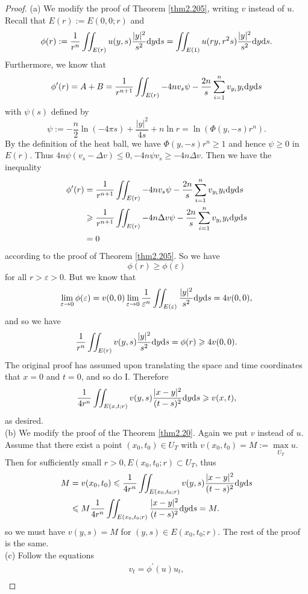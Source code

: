 \documentclass[hyperref,UTF8,12pt]{article}
\numberwithin{equation}{subsection}
\theoremstyle{plain}
\theoremstyle{definition}
\numberwithin{theorem}{section}
\numberwithin{lemma}{section}
\numberwithin{proposition}{section}
\numberwithin{remark}{section}
\numberwithin{corollary}{section}
\numberwithin{definition}{section}
\numberwithin{problem}{section}
\numberwithin{example}{section}
\def\dif{\textup{d}}
\renewcommand{\leq}{\leqslant}
\renewcommand{\geq}{\geqslant}
\newcommand{\ve}{\varepsilon}
\begin{document}
\begin{proof}
(a) We modify the proof of Theorem \ref{thm2.205}, writing $v$ instead of $u$. Recall that $E(r):=E(0,0;r)$ and \[\phi(r):=\frac{1}{r^n}\iint_{E(r)}u(y,s)\frac{|y|^2}{s^2}\dif y\dif s=\iint_{E(1)}u(ry,r^2s)\frac{|y|^2}{s^2}\dif y\dif s.\] Furthermore, we know that \[\phi^{\prime}(r)=A+B=\frac{1}{r^{n+1}}\iint_{E(r)}-4nv_s\psi-\frac{2n}{s} \sum_{i=1}^nv_{y_i}y_i\dif y\dif s\] with $\psi(s)$ defined by \[\psi:=-\frac{n}{2}
\ln(-4\pi s)+\frac{|y|^2}{4s}+n\ln r=\ln(\Phi(y,-s)r^n).\]By the definition of the heat ball, we have $\Phi(y,-s)r^n\geq1$ and hence $\psi\geq0$ in $E(r)$. Thus $4n\psi(v_s-\Delta v)\leq 0,-4n\psi v_s\geq-4n\Delta v$. Then we have the inequality
\[\begin{aligned}
	\phi^\prime(r)&=\frac{1}{r^{n+1}}\iint_{E(r)}-4nv_s\psi-\frac{2n}{s}\sum_{i=1}^n v_{y_i}y_i\dif y\dif s\\
	&\geq\frac{1}{r^{n+1}}\iint_{E(r)}-4n\Delta v\psi-\frac{2n}{s}\sum_{i=1}^n v_{y_i}y_i\dif y\dif s\\
	&=0\end{aligned}\]according to the proof of Theorem \ref{thm2.205}. So we have
\[\phi(r)\geq\phi(\ve)\]for all $r>\ve>0$. But we know that\[
\lim_{\ve\to0}\phi(\ve)=v(0,0)\lim_{\ve\to0}\frac{1}{\ve^n}\iint_{E(\ve)} \frac{|y|^2}{s^2}\dif y\dif s=4v(0,0),\]and so we have \[\frac{1}{r^n}\iint_{E(r)}v(y,s)\frac{|y|^2}{s^2}\dif y\dif s=\phi(r)\geq4v(0,0).\]The original proof has assumed upon translating the space and time coordinates that $x=0$ and $t=0$, and so do I. Therefore \[\frac{1}{4r^n}\iint_{E(x,t;r)}v(y,s) \frac{|x-y|^2}{(t-s)^2}\dif y\dif s\geq v(x,t),\]as desired.\\
(b) We modify the proof of the Theorem \ref{thm2.20}. Again we put $v$ instead of $u$. Assume that there exist a point $(x_0,t_0)\in U_T$ with $v(x_0,t_0)=M:=\max\limits _{\overline{U_T}}u$. Then for sufficiently small $r>0,E(x_0,t_0;r)\subset U_T$, thus
\[\begin{aligned}
	M&=v(x_0,t_0)\leq\frac{1}{4r^n}\iint_{E(x_0,t_0;r)}v(y,s)\frac{|x-y|^2}{(t-s)^2}\dif y\dif s\\
	&\leq M\frac{1}{4r^n}\iint_{E(x_0,t_0;r)}\frac{|x-y|^2}{(t-s)^2}\dif y\dif s=M.
\end{aligned}\]
so we must have $v(y,s)=M$ for $(y,s)\in E(x_0,t_0;r)$. The rest of the proof is the same.\\
(c) Follow the equations\[\begin{gathered}
	v_t=\phi^\prime(u)u_t,\\

\end{gathered}\]
\end{proof}
\end{document}

